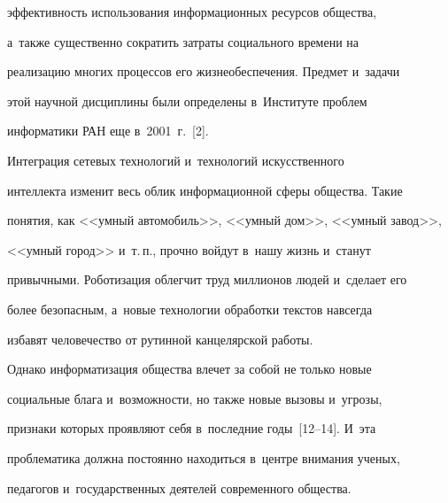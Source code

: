 эф\-фек\-тив\-ность использования информационных ресурсов общества, 


а~так\-же существенно со\-кра\-тить затраты социального времени на 


реализацию многих процессов его жиз\-не\-обес\-пе\-че\-ния. Пред\-мет и~задачи 


этой научной дис\-цип\-ли\-ны были определены в~Институте проб\-лем 


информатики РАН еще в~2001~г.~[2]. 


   


   Интеграция сетевых технологий и~технологий искусственного 


интеллекта изменит весь облик информационной сферы общества. Такие 


понятия, как <<умный автомобиль>>, <<умный дом>>, <<умный завод>>, 


<<умный город>> и~т.\,п., прочно войдут в~нашу жизнь и~станут 


привычными. Роботизация об\-лег\-чит труд миллионов людей и~сделает его 


более безопас\-ным, а~новые технологии обработки текс\-тов навсегда 


избавят человечество от рутинной канцелярской работы. 


   


   Однако информатизация общества влечет за собой не только новые 


социальные блага и~воз\-мож\-но\-сти, но так\-же новые вызовы и~угрозы, 


при\-зна\-ки которых проявляют себя в~по\-след\-ние годы~[12--14]. И~эта 


проб\-ле\-ма\-ти\-ка долж\-на по\-сто\-ян\-но находиться в~цент\-ре внимания ученых, 


педагогов и~государственных деятелей со\-вре\-мен\-но\-го об\-ще\-ства. 


   


